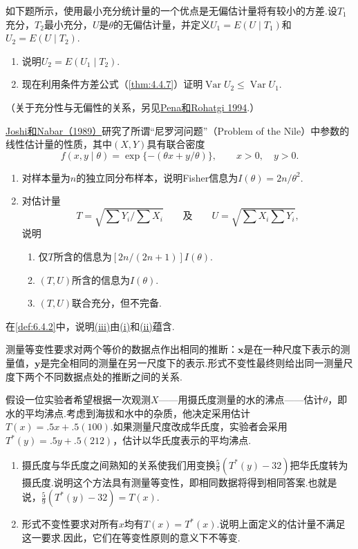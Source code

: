 \begin{exercise}\label{exercise:6.36}
如下题所示，使用最小充分统计量的一个优点是无偏估计量将有较小的方差.设$T_1$充分，$T_2$最小充分，$U$是$\theta$的无偏估计量，并定义$U_1=E(U\mid T_1)$和$U_2=E(U\mid T_2)$.
\begin{enumerate}[label=(\alph*)]
\item 说明$U_2=E(U_1\mid T_2)$.
\item 现在利用条件方差公式（\autoref{thm:4.4.7}）证明$\operatorname{Var}U_2\le\operatorname{Var}U_1$.
\end{enumerate}
（关于充分性与无偏性的关系，另见\hyperref[bib:source240]{Pena和Rohatgi 1994}.）
\end{exercise}
\begin{exercise}\label{exercise:6.37}
\hyperref[bib:source182]{Joshi和Nabar（1989）}研究了所谓“尼罗河问题”（Problem of the Nile）中参数的线性估计量的性质，其中$(X,Y)$具有联合密度
$$f(x,y\mid\theta)=\exp\{-(\theta x+y/\theta)\},\qquad x>0,\quad y>0.$$
\begin{enumerate}[label=(\alph*)]
\item 对样本量为$n$的独立同分布样本，说明Fisher信息为$I(\theta)=2n/\theta^2$.
\item 对估计量
$$T=\sqrt{\sum Y_i/\sum X_i}\qquad\text{及}\qquad U=\sqrt{\sum X_i\sum Y_i},$$
说明
\begin{enumerate}[label=(\roman*)]
\item 仅$T$所含的信息为$[2n/(2n+1)]I(\theta)$.
\item $(T,U)$所含的信息为$I(\theta)$.
\item $(T,U)$联合充分，但不完备.
\end{enumerate}
\end{enumerate}
\end{exercise}
\begin{exercise}\label{exercise:6.38}
在\autoref{def:6.4.2}中，说明\hyperref[item:6.4.2iii]{(iii)}由\hyperref[item:6.4.2i]{(i)}和\hyperref[item:6.4.2ii]{(ii)}蕴含.
\end{exercise}
\begin{exercise}\label{exercise:6.39}
测量等变性要求对两个等价的数据点作出相同的推断：$\boldsymbol x$是在一种尺度下表示的测量值，$\boldsymbol y$是完全相同的测量在另一尺度下的表示.形式不变性最终则给出同一测量尺度下两个不同数据点处的推断之间的关系.

假设一位实验者希望根据一次观测$X$——用摄氏度测量的水的沸点——估计$\theta$，即水的平均沸点.考虑到海拔和水中的杂质，他决定采用估计$T(x)=.5x+.5(100)$.如果测量尺度改成华氏度，实验者会采用$T^*(y)=.5y+.5(212)$，估计以华氏度表示的平均沸点.
\begin{enumerate}[label=(\alph*)]
\item 摄氏度与华氏度之间熟知的关系使我们用变换$\frac59(T^*(y)-32)$把华氏度转为摄氏度.说明这个方法具有测量等变性，即相同数据将得到相同答案.也就是说，$\frac59(T^*(y)-32)=T(x)$.
\item 形式不变性要求对所有$x$均有$T(x)=T^*(x)$.说明上面定义的估计量不满足这一要求.因此，它们在等变性原则的意义下不等变.
\end{enumerate}
\end{exercise}
